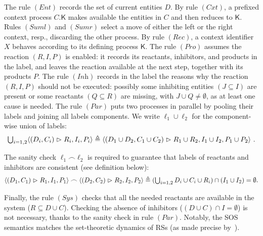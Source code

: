 The rule $(\textit{Ent})$ records the set of current entities $D$.
By rule $(\textit{Cxt})$, a prefixed context process $C.\mathsf{K}$ makes available the entities in $C$ and then reduces to $\mathsf{K}$. 
Rules $(\textit{Suml})$ and $(\textit{Sumr})$ select a move of either the left or the right context, resp., discarding the other process.
By rule $(\textit{Rec})$, a context identifier $X$ behaves according to its defining process $\mathsf{K}$.
The rule $(\textit{Pro})$ assumes the reaction $(R,I,P)$ is enabled: it records its reactants, inhibitors, and products in the label, and leaves the reaction  available at the next step, together with its products $P$.
The rule $(\textit{Inh})$ records in the label the reasons why the reaction $(R,I,P)$ should not be executed: possibly some inhibiting entities $(J \subseteq I)$ are present or some reactants $(Q \subseteq R)$ are missing, with $J \cup Q \neq \emptyset$, as at least one cause is needed.
The rule $(\textit{Par})$ puts two processes in parallel by pooling their labels and joining all labels components. We write $\ell_1\cup\ell_2$ for the component-wise union of labels:
%
{\footnotesize
\[
\textstyle
\bigcup_{i=1,2} \langle (D_i,C_i)\vartriangleright R_i,I_i,P_i\rangle
\triangleq 
\langle (D_1\cup D_2,C_1\cup C_2)\vartriangleright R_1\cup R_2,I_1\cup I_2,P_1\cup P_2\rangle\ .
\]}


The sanity check $\ell_1\frown\ell_2$ is required to guarantee that labels of reactants and inhibitors are consistent (see definition below):
%
{\footnotesize
\[
\langle (D_1,C_1)\vartriangleright R_1,I_1,P_1\rangle
\frown
\langle (D_2,C_2)\vartriangleright R_2,I_2,P_2\rangle
\triangleq
\textstyle (\bigcup_{i=1,2} D_i\cup C_i \cup R_i) \cap (I_1\cup I_2) = \emptyset .
\]
}


Finally, the rule $(\textit{Sys})$ checks that all the needed reactants are available in the system ($R \subseteq D\cup C$). Checking the absence of inhibitors  ($(D\cup C)\cap I = \emptyset$) is not necessary, thanks to the sanity check in rule $(\textit{Par})$.
%
Notably, the SOS semantics matches the set-theoretic dynamics of RSs (as made precise by~\cite[Th.~19]{DBLP:journals/tcs/BrodoBF21}). 


